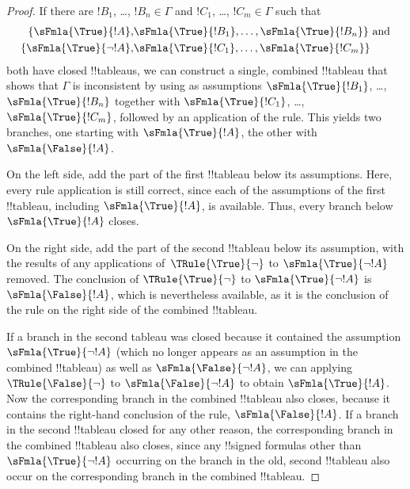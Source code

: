 \documentclass[../../../include/open-logic-section]{subfiles}
\begin{document}
\begin{proof}
  If there are $!B_1$, \dots, $!B_n \in \Gamma$ and $!C_1$, \dots,
  $!C_m \in \Gamma$ such that
  \begin{align*}
    \{\sFmla{\True}{!A}, &
    \sFmla{\True}{!B_1}, \dots, \sFmla{\True}{!B_n}\} \text{ and}\\
    \{\sFmla{\True}{\lnot !A}, &
    \sFmla{\True}{!C_1}, \dots, \sFmla{\True}{!C_m}\}
  \end{align*}
  both have closed !!{tableau}s, we can construct a single, combined
  !!{tableau} that shows that $\Gamma$ is inconsistent by using as
  assumptions $\sFmla{\True}{!B_1}$, \dots, $\sFmla{\True}{!B_n}$
  together with $\sFmla{\True}{!C_1}$, \dots, $\sFmla{\True}{!C_m}$,
  followed by an application of the \Cut{} rule. This yields two
  branches, one starting with $\sFmla{\True}{!A}$, the other with
  $\sFmla{\False}{!A}$.  
  
  On the left side, add the part of the first
  !!{tableau} below its assumptions. Here, every rule application is still
  correct, since each of the assumptions of the first !!{tableau},
  including $\sFmla{\True}{!A}$, is available. Thus, every branch
  below $\sFmla{\True}{!A}$ closes. 
  
  On the right side, add the part of the second !!{tableau} below its
  assumption, with the results of any applications
  of~$\TRule{\True}{\lnot}$ to $\sFmla{\True}{\lnot !A}$ removed.  The
  conclusion of $\TRule{\True}{\lnot}$ to $\sFmla{\True}{\lnot !A}$ is
  $\sFmla{\False}{!A}$, which is nevertheless available, as it is the
  conclusion of the \Cut{} rule on the right side of the combined !!{tableau}.

  If a branch in the second tableau was closed because it contained
  the assumption $\sFmla{\True}{\lnot !A}$ (which no longer appears as
  an assumption in the combined !!{tableau}) as well as
  $\sFmla{\False}{\lnot !A}$, we can applying $\TRule{\False}{\lnot}$
  to $\sFmla{\False}{\lnot !A}$ to obtain $\sFmla{\True}{!A}$. Now the
  corresponding branch in the combined !!{tableau} also closes,
  because it contains the right-hand conclusion of the \Cut{} rule,
  $\sFmla{\False}{!A}$. If a branch in the second !!{tableau} closed
  for any other reason, the corresponding branch in the combined
  !!{tableau} also closes, since any !!{signed formula}s other than
  $\sFmla{\True}{\lnot !A}$ occurring on the branch in the old, second
  !!{tableau} also occur on the corresponding branch in the combined
  !!{tableau}.
  \end{proof}
\end{document}
